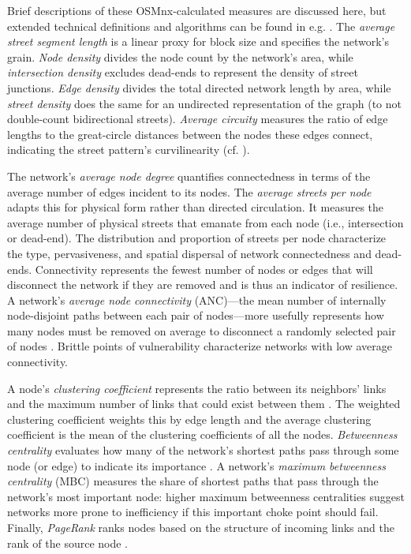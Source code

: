 \documentclass[11pt]{article}
\begin{document}
\begin{multicols}{2}
Brief descriptions of these OSMnx-calculated measures are discussed here, but extended technical definitions and algorithms can be found in e.g. \citep{trudeau_introduction_1994, albert_statistical_2002, dorogovtsev_evolution_2002, brandes_network_2005, costa_characterization_2007, newman_structure_2003, newman_networks:_2010, barthelemy_spatial_2011, cranmer_navigating_2017}. The \emph{average street segment length} is a linear proxy for block size and specifies the network's grain. \emph{Node density} divides the node count by the network's area, while \emph{intersection density} excludes dead-ends to represent the density of street junctions. \emph{Edge density} divides the total directed network length by area, while \emph{street density} does the same for an undirected representation of the graph (to not double-count bidirectional streets). \emph{Average circuity} measures the ratio of edge lengths to the great-circle distances between the nodes these edges connect, indicating the street pattern's curvilinearity (cf. \citet{boeing_morphology_2018}).

The network's \emph{average node degree} quantifies connectedness in terms of the average number of edges incident to its nodes. The \emph{average streets per node} adapts this for physical form rather than directed circulation. It measures the average number of physical streets that emanate from each node (i.e., intersection or dead-end). The distribution and proportion of streets per node characterize the type, pervasiveness, and spatial dispersal of network connectedness and dead-ends. Connectivity represents the fewest number of nodes or edges that will disconnect the network if they are removed and is thus an indicator of resilience. A network's \emph{average node connectivity} (ANC)---the mean number of internally node-disjoint paths between each pair of nodes---more usefully represents how many nodes must be removed on average to disconnect a randomly selected pair of nodes \citep{beineke_average_2002,dankelmann_bounds_2003}. Brittle points of vulnerability characterize networks with low average connectivity.

A node's \emph{clustering coefficient} represents the ratio between its neighbors' links and the maximum number of links that could exist between them \citep{jiang_topological_2004, opsahl_clustering_2009}. The weighted clustering coefficient weights this by edge length and the average clustering coefficient is the mean of the clustering coefficients of all the nodes. \emph{Betweenness centrality} evaluates how many of the network's shortest paths pass through some node (or edge) to indicate its importance \citep{barthelemy_betweenness_2004,huang_trajgraph:_2016, zhong_revealing_2017}. A network's \emph{maximum betweenness centrality} (MBC) measures the share of shortest paths that pass through the network's most important node: higher maximum betweenness centralities suggest networks more prone to inefficiency if this important choke point should fail. Finally, \emph{PageRank} ranks nodes based on the structure of incoming links and the rank of the source node \citep{brin_anatomy_1998, jiang_predicting_2008, agryzkov_algorithm_2012, chin_geographically_2015, gleich_pagerank_2015}.


\end{multicols}
\end{document}
